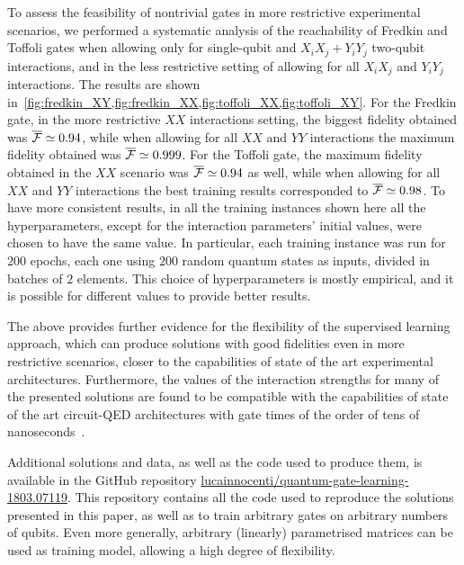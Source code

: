 To assess the feasibility of nontrivial gates in more restrictive experimental scenarios, we performed a systematic analysis of the reachability of Fredkin and Toffoli gates when allowing only for single-qubit and $X_i X_j+Y_i Y_j$ two-qubit interactions, and in the less restrictive setting of allowing for all $X_i X_j$ and $Y_i Y_j$ interactions.
The results are shown in~\cref{fig:fredkin_XY,fig:fredkin_XX,fig:toffoli_XX,fig:toffoli_XY}.
For the Fredkin gate, in the more restrictive $XX$ interactions setting, the biggest fidelity obtained was $\overline{{\mathcal{F}}}\simeq 0.94$, while when allowing for all $XX$ and $YY$ interactions the maximum fidelity obtained was $\overline{{\mathcal{F}}}\simeq0.999$.
For the Toffoli gate, the maximum fidelity obtained in the $XX$ scenario was $\overline{{\mathcal{F}}}\simeq0.94$ as well, while when allowing for all $XX$ and $YY$ interactions the best training results corresponded to $\overline{{\mathcal{F}}}\simeq 0.98$.
To have more consistent results, in all the training instances shown here all the hyperparameters, except for the interaction parameters' initial values, were chosen to have the same value.
In particular, each training instance was run for $200$ epochs, each one using $200$ random quantum states as inputs, divided in batches of $2$ elements.
This choice of hyperparameters is mostly empirical, and it is possible for different values to provide better results.


The above provides further evidence for the flexibility of the supervised learning approach, which can produce solutions with good fidelities even in more restrictive scenarios, closer to the capabilities of state of the art experimental architectures.
Furthermore, the values of the interaction strengths for many of the presented solutions are found to be compatible with the capabilities of state of the art circuit-QED architectures with gate times of the order of tens of nanoseconds~\cite{potočnik2018studying}.

Additional solutions and data, as well as the code used to produce them, is available in the GitHub repository
\href{https://github.com/lucainnocenti/quantum-gate-learning-1803.07119}{lucainnocenti/quantum-gate-learning-1803.07119}.
This repository contains all the code used to reproduce the solutions presented in this paper, as well as to train arbitrary gates on arbitrary numbers of qubits.
Even more generally, arbitrary (linearly) parametrised matrices can be used as training model, allowing a high degree of flexibility.

